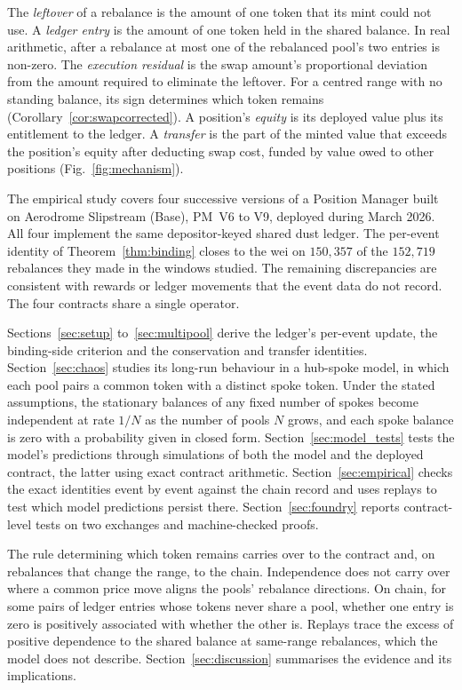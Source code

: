 \documentclass[11pt,a4paper]{article}
\DeclareRobustCommand{\acr}[1]{{\addfontfeatures{Letters=UppercaseSmallCaps,LetterSpace=2}#1}}
\theoremstyle{siphon}
\begin{document}
The \emph{leftover} of a rebalance is the amount of one token that its mint could not use. A \emph{ledger entry} is the amount of one token held in the shared balance. In real arithmetic, after a rebalance at most one of the rebalanced pool's two entries is non-zero. The \emph{execution residual} is the swap amount's proportional deviation from the amount required to eliminate the leftover. For a centred range with no standing balance, its sign determines which token remains (Corollary~\ref{cor:swapcorrected}). A position's \emph{equity} is its deployed value plus its entitlement to the ledger. A \emph{transfer} is the part of the minted value that exceeds the position's equity after deducting swap cost, funded by value owed to other positions (Fig.~\ref{fig:mechanism}).

The empirical study covers four successive versions of a Position Manager built on Aerodrome Slipstream (Base), \acr{PM}~V6 to V9, deployed during March 2026. All four implement the same depositor-keyed shared dust ledger. The per-event identity of Theorem~\ref{thm:binding} closes to the wei on $150{,}357$ of the $152{,}719$ rebalances they made in the windows studied. The remaining discrepancies are consistent with rewards or ledger movements that the event data do not record. The four contracts share a single operator.

Sections~\ref{sec:setup} to~\ref{sec:multipool} derive the ledger's per-event update, the binding-side criterion and the conservation and transfer identities. Section~\ref{sec:chaos} studies its long-run behaviour in a hub-spoke model, in which each pool pairs a common token with a distinct spoke token. Under the stated assumptions, the stationary balances of any fixed number of spokes become independent at rate $1/N$ as the number of pools $N$ grows, and each spoke balance is zero with a probability given in closed form. Section~\ref{sec:model_tests} tests the model's predictions through simulations of both the model and the deployed contract, the latter using exact contract arithmetic. Section~\ref{sec:empirical} checks the exact identities event by event against the chain record and uses replays to test which model predictions persist there. Section~\ref{sec:foundry} reports contract-level tests on two exchanges and machine-checked proofs.

The rule determining which token remains carries over to the contract and, on rebalances that change the range, to the chain. Independence does not carry over where a common price move aligns the pools' rebalance directions. On chain, for some pairs of ledger entries whose tokens never share a pool, whether one entry is zero is positively associated with whether the other is. Replays trace the excess of positive dependence to the shared balance at same-range rebalances, which the model does not describe. Section~\ref{sec:discussion} summarises the evidence and its implications.
\end{document}
